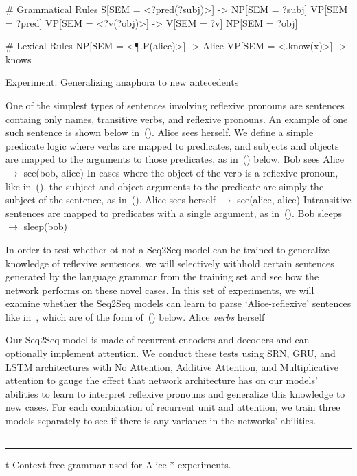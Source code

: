 # Grammatical Rules
S[SEM = <?pred(?subj)>] -> NP[SEM = ?subj] VP[SEM = ?pred]
VP[SEM = <?v(?obj)>] -> V[SEM = ?v] NP[SEM = ?obj]

# Lexical Rules
NP[SEM = <\P.P(alice)>] -> Alice
VP[SEM = <\x.know(x)>] -> knows
\endtt

\sec Experiment: Generalizing anaphora to new antecedents

One of the simplest types of sentences involving reflexive pronouns are 
sentences containg only names, transitive verbs, and reflexive pronouns. An
example of one such sentence is shown below in~(\nextx).
	Alice sees herself.
\xe
We define a simple predicate logic where verbs are mapped to predicates, and
subjects and objects are mapped to the arguments to those predicates, as 
in~(\nextx) below.
\ex
	Bob sees Alice $\to$ see(bob, alice)
\xe
In cases where the object of the verb is a reflexive pronoun, like in~(\blastx), the subject and
object arguments to the predicate are simply the subject of the sentence, as
in~(\nextx).
\ex
	Alice sees herself $\to$ see(alice, alice)
\xe
Intransitive sentences are mapped to predicates with a single argument, as 
in~(\nextx).
\ex
	Bob sleeps $\to$ sleep(bob)
\xe

In order to test whether ot not a Seq2Seq model can be trained to generalize 
knowledge of reflexive sentences, we will selectively withhold certain 
sentences generated by the language grammar from the training set and see how
the network performs on these novel cases. In this set of experiments, we will
examine whether the Seq2Seq models can learn to parse `Alice-reflexive' 
sentences like in~, which are of the form of~(\nextx) below.
\ex
	Alice {\it verbs} herself
\xe

Our Seq2Seq model is made of recurrent encoders and decoders and can 
optionally implement attention. We conduct these tests using SRN, GRU, and LSTM
architectures with No Attention, Additive Attention, and Multiplicative 
attention to gauge the effect that network architecture has on our models' 
abilities to learn to interpret reflexive pronouns and generalize this 
knowledge to new cases. For each combination of recurrent unit and attention,
we train three models separately to see if there is any variance in the 
networks' abilities.

\ex
\hrule width 5in
\smallskip
{}
\smallskip
\hrule width 5in
\xe
\caption/t Context-free grammar used for Alice-* experiments.


